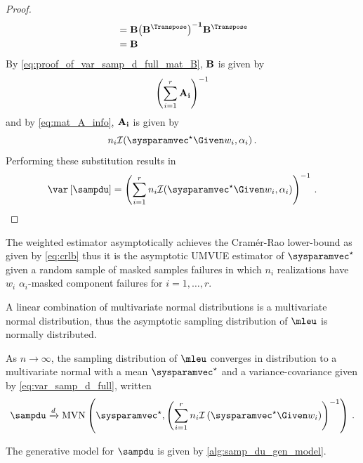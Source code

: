 \documentclass[ ../main.tex]{subfiles}
\begin{document}
\begin{proof}
\begin{align}
        &= \matrx{B} \matrx{\left(B^{\Transpose}\right)^{-1}} 
        \matrx{B^{\Transpose}}\\
        &= \matrx{B}
\end{align}
By \cref{eq:proof_of_var_samp_d_full_mat_B}, $\mathbf{B}$ is given by
\begin{equation}
    \left( \sum_{i=1}^{r} \mathbf{A_i} \right)^{-1}
\end{equation}
and by \cref{eq:mat_A_info}, $\mathbf{A_i}$ is given by
\begin{equation}
    n_i \infomatrx(\tparam\sysparamvec \Given w_i, \alpha_i)\,.
\end{equation}
Performing these substitution results in
\begin{equation}
    \var\left[\sampdu\right] = \left( \sum_{i=1}^{r} n_i \infomatrx(\tparam\sysparamvec \Given w_i, \alpha_i) \right)^{-1}\,.
\end{equation}
\end{proof}

The weighted estimator asymptotically achieves the Cram\'{e}r-Rao lower-bound as given by \cref{eq:crlb} thus it is the asymptotic UMVUE estimator of $\tparam\sysparamvec$ given a random sample of masked samples failures in which $n_i$ realizations have $w_i$ $\alpha_i$-masked component failures for $i=1,\ldots,r$.

A linear combination of multivariate normal distributions is a multivariate normal distribution, thus the asymptotic sampling distribution of $\mleu$ is normally distributed.
\begin{postulate}
\label{def:converge_in_dist_full}
As $n \to \infty$, the sampling distribution of $\mleu$ converges in distribution to a multivariate normal with a mean $\tparam\sysparamvec$ and a variance-covariance given by \cref{eq:var_samp_d_full}, written
\begin{equation}
\label{eq:converge_in_dist_weighted}
    \sampdu \xrightarrow{d} \mvn\left(\tparam\sysparamvec, \left(\sum_{i=1}^{r} n_i \infomatrx\left(\tparam\sysparamvec \Given w_i \right)\right)^{-1}\right)\,.
\end{equation}
\end{postulate}

The generative model for $\sampdu$ is given by \cref{alg:samp_du_gen_model}.
\begin{algorithm}
    \DontPrintSemicolon
    \BlankLine
\caption{Generative model of maximum likelihood estimator}
\label{alg:samp_du_gen_model}
\end{algorithm}
\end{document}

